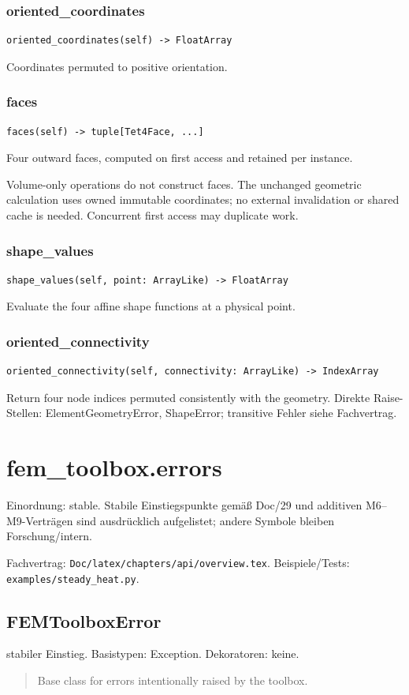 \subsubsection*{oriented\_coordinates}
\begin{lstlisting}
oriented_coordinates(self) -> FloatArray
\end{lstlisting}
Coordinates permuted to positive orientation.
\subsubsection*{faces}
\begin{lstlisting}
faces(self) -> tuple[Tet4Face, ...]
\end{lstlisting}
Four outward faces, computed on first access and retained per instance.\par Volume-only operations do not construct faces. The unchanged geometric calculation uses owned immutable coordinates; no external invalidation or shared cache is needed. Concurrent first access may duplicate work.
\subsubsection*{shape\_values}
\begin{lstlisting}
shape_values(self, point: ArrayLike) -> FloatArray
\end{lstlisting}
Evaluate the four affine shape functions at a physical point.
\subsubsection*{oriented\_connectivity}
\begin{lstlisting}
oriented_connectivity(self, connectivity: ArrayLike) -> IndexArray
\end{lstlisting}
Return four node indices permuted consistently with the geometry.
Direkte Raise-Stellen: ElementGeometryError, ShapeError; transitive Fehler siehe Fachvertrag.
\section{fem\_toolbox.errors}
Einordnung: stable. Stabile Einstiegspunkte gemäß Doc/29 und additiven M6–M9-Verträgen sind ausdrücklich aufgelistet; andere Symbole bleiben Forschung/intern.
\par Fachvertrag: \nolinkurl{Doc/latex/chapters/api/overview.tex}. Beispiele/Tests:
\nolinkurl{examples/steady_heat.py}.
\subsection{FEMToolboxError}
stabiler Einstieg.
Basistypen: Exception. Dekoratoren: keine.
\begin{quote}
Base class for errors intentionally raised by the toolbox.
\end{quote}
